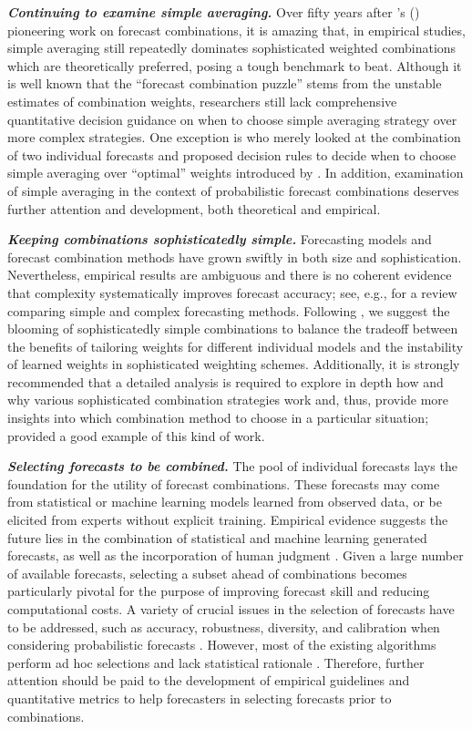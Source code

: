 \documentclass[11pt]{article}
\def\citeapos#1{\citeauthor{#1}'s (\citeyear{#1})}
\begin{document}
\textbf{\textit{Continuing to examine simple averaging.}} Over fifty years after \citeapos{Bates1969-yj} pioneering work on forecast combinations, it is amazing that, in empirical studies, simple averaging still repeatedly dominates sophisticated weighted combinations which are theoretically preferred, posing a tough benchmark to beat. Although it is well known that the ``forecast combination puzzle'' stems from the unstable estimates of combination weights, researchers still lack comprehensive quantitative decision guidance on when to choose simple averaging strategy over more complex strategies. One exception is \citet{Blanc2016-sn} who merely looked at the combination of two individual forecasts and proposed decision rules to decide when to choose simple averaging over ``optimal'' weights introduced by \citet{Bates1969-yj}. In addition, examination of simple averaging in the context of probabilistic forecast combinations deserves further attention and development, both theoretical and empirical.

\textbf{\textit{Keeping combinations sophisticatedly simple.}} Forecasting models and forecast combination methods have grown swiftly in both size and sophistication. Nevertheless, empirical results are ambiguous and there is no coherent evidence that complexity systematically improves forecast accuracy; see, e.g., \citet{Green2015-mi} for a review comparing simple and complex forecasting methods. Following \citet{Zellner2001-si}, we suggest the blooming of sophisticatedly simple combinations to balance the tradeoff between the benefits of tailoring weights for different individual models and the instability of learned weights in sophisticated weighting schemes. Additionally, it is strongly recommended that a detailed analysis is required to explore in depth how and why various sophisticated combination strategies work and, thus, provide more insights into which combination method to choose in a particular situation; \citet{Petropoulos2018-fw} provided a good example of this kind of work.

\textbf{\textit{Selecting forecasts to be combined.}} The pool of individual forecasts lays the foundation for the utility of forecast combinations. These forecasts may come from statistical or machine learning models learned from observed data, or be elicited from experts without explicit training. Empirical evidence suggests the future lies in the combination of statistical and machine learning generated forecasts, as well as the incorporation of human judgment \citep{Petropoulos2018-ad,Makridakis2020-hu,Petropoulos2021-ft}. Given a large number of available forecasts, selecting a subset ahead of combinations becomes particularly pivotal for the purpose of improving forecast skill and reducing computational costs. A variety of crucial issues in the selection of forecasts have to be addressed, such as accuracy, robustness, diversity, and calibration when considering probabilistic forecasts \citep{Lichtendahl2020-ut}. However, most of the existing algorithms perform ad hoc selections and lack statistical rationale \citep{Kourentzes2019-na}. Therefore, further attention should be paid to the development of empirical guidelines and quantitative metrics to help forecasters in selecting forecasts prior to combinations.
\end{document}
